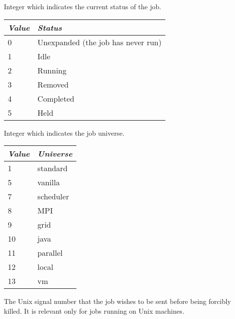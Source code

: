 \begin{description}
\item[\AdAttr{JobStatus}:]  Integer which indicates the current
status of the job.
\begin{center}
\begin{table}[hbt]
\begin{tabular}{|p{2cm}p{10cm}|} \hline
\emph{Value} & \emph{Status} \\ \hline \hline
0 & Unexpanded (the job has never run) \\ \hline
1 & Idle \\ \hline
2 & Running \\ \hline
3 & Removed \\ \hline
4 & Completed \\ \hline
5 & Held \\ \hline
\end{tabular}
\end{table}
\end{center}

\item[\AdAttr{JobUniverse}:]  Integer which indicates the job
universe.

\begin{center}
\begin{table}[hbt]
\begin{tabular}{|p{2cm}p{3cm}|} \hline
\emph{Value} & \emph{Universe} \\ \hline \hline
1 & standard \\ \hline
5 & vanilla \\ \hline
7 & scheduler \\ \hline
8 & MPI \\ \hline
9 & grid \\ \hline
10 & java \\ \hline
11 & parallel \\ \hline
12 & local \\ \hline
13 & vm \\ \hline
\end{tabular}
\end{table}
\end{center}

\item[\AdAttr{KillSig}:]  The Unix signal number that the job wishes to be
sent before being forcibly killed.
It is relevant only for jobs running on Unix machines.


\end{description}

